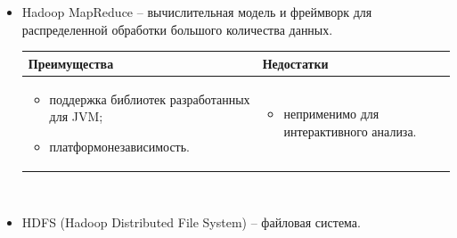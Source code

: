 \begin{itemize}
    \item Hadoop MapReduce -- вычислительная модель и фреймворк для распределенной обработки большого количества данных.

          \begin{tabularx}{450pt}{X|X}
              \textbf{Преимущества}     & \textbf{Недостатки} \\
              \hline
              \begin{itemize}[noitemsep,nolistsep,leftmargin=0pt,labelindent=0pt]
                  \item поддержка библиотек разработанных для JVM;
                  \item платформонезависимость.
              \end{itemize} &
              \begin{itemize}[noitemsep,nolistsep,leftmargin=0pt,labelindent=0pt]
                  \item неприменимо для интерактивного анализа.
              \end{itemize}
          \end{tabularx}\\
    \item HDFS (Hadoop Distributed File System) -- файловая система.


\end{itemize}
